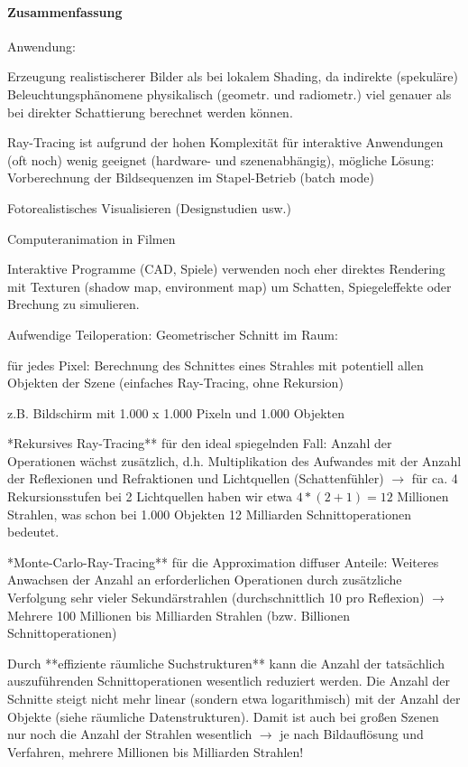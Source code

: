 \documentclass[landscape]{article}
\begin{document}
\begin{multicols}{3}
  \paragraph{Zusammenfassung}
  Anwendung:
  \begin{itemize*}
    \item Erzeugung realistischerer Bilder als bei lokalem Shading, da indirekte (spekuläre) Beleuchtungsphänomene physikalisch (geometr. und radiometr.) viel genauer als bei direkter Schattierung berechnet werden können.
    \item Ray-Tracing ist aufgrund der hohen Komplexität für interaktive Anwendungen (oft noch) wenig geeignet (hardware- und szenenabhängig), mögliche Lösung: Vorberechnung der Bildsequenzen im Stapel-Betrieb (batch mode)
    \item Fotorealistisches Visualisieren (Designstudien usw.)
    \item Computeranimation in Filmen
    \item Interaktive Programme (CAD, Spiele) verwenden noch eher direktes Rendering mit Texturen (shadow map, environment map) um Schatten, Spiegeleffekte oder Brechung zu simulieren.
    \item Aufwendige Teiloperation: Geometrischer Schnitt im Raum:
    \item für jedes Pixel: Berechnung des Schnittes eines Strahles mit potentiell allen Objekten der Szene (einfaches Ray-Tracing, ohne Rekursion)
    \item z.B. Bildschirm mit 1.000 x 1.000 Pixeln und 1.000 Objekten
    \item **Rekursives Ray-Tracing** für den ideal spiegelnden Fall: Anzahl der Operationen wächst zusätzlich, d.h. Multiplikation des Aufwandes mit der Anzahl der Reflexionen und Refraktionen und Lichtquellen (Schattenfühler) $\rightarrow$ für ca. 4 Rekursionsstufen bei 2 Lichtquellen haben wir etwa $4*(2 + 1) = 12$ Millionen Strahlen, was schon bei 1.000 Objekten 12 Milliarden Schnittoperationen bedeutet.
    \item **Monte-Carlo-Ray-Tracing** für die Approximation diffuser Anteile: Weiteres Anwachsen der Anzahl an erforderlichen Operationen durch zusätzliche Verfolgung sehr vieler Sekundärstrahlen (durchschnittlich 10 pro Reflexion) $\rightarrow$ Mehrere 100 Millionen bis Milliarden Strahlen (bzw. Billionen Schnittoperationen)
    \item Durch **effiziente räumliche Suchstrukturen** kann die Anzahl der tatsächlich auszuführenden Schnittoperationen wesentlich reduziert werden. Die Anzahl der Schnitte steigt nicht mehr linear (sondern etwa logarithmisch) mit der Anzahl der Objekte (siehe räumliche Datenstrukturen). Damit ist auch bei großen Szenen nur noch die Anzahl der Strahlen wesentlich $\rightarrow$ je nach Bildauflösung und Verfahren, mehrere Millionen bis Milliarden Strahlen!

\end{itemize*}
\end{multicols}
\end{document}
